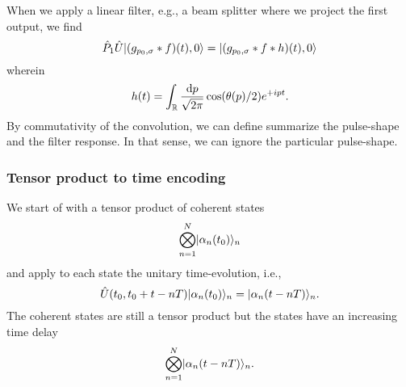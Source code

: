 When we apply a linear filter, e.g., a beam splitter where we project the first output, we find
\begin{equation}
	\hat{P}_1\hat{U}\lvert(g_{p_0,\sigma}*f)(t),0\rangle
	=
	\lvert(g_{p_0,\sigma}*f*h)(t),0\rangle
\end{equation}
wherein
\begin{equation}
	h(t)
	=
	\int_{\mathbb{R}}
	\frac{\odif{p}}{\sqrt{2\pi}}
	\cos(\theta(p)/2)
	e^{+ipt}
	.
\end{equation}
By commutativity of the convolution, we can define summarize the pulse-shape and the filter response.
In that sense, we can ignore the particular pulse-shape.

\subsubsection{Tensor product to time encoding}

We start of with a tensor product of coherent states
\begin{equation}
	\bigotimes_{n=1}^N
	\lvert\alpha_n(t_0)\rangle_n
\end{equation}
and apply to each state the unitary time-evolution, i.e.,
\begin{equation}
	\hat{U}(t_0,t_0+t-nT)
	\lvert\alpha_n(t_0)\rangle_n
	=
	\lvert\alpha_n(t-nT)\rangle_n
	.
\end{equation}
The coherent states are still a tensor product but the states have an increasing time delay
\begin{equation}
	\bigotimes_{n=1}^N
	\lvert\alpha_n(t-nT)\rangle_n
	.
\end{equation}

